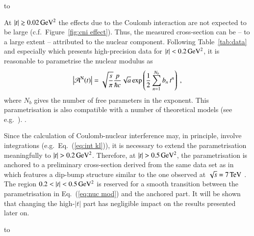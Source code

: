 \vskip3mm
\hbox to

At $|t| \gtrsim 0.02\,{\rm GeV^2}$ the effects due to the Coulomb interaction are not expected to be large (c.f.~Figure~\ref{fig:cni effect}). Thus, the measured cross-section can be -- to a large extent -- attributed to the nuclear component. Following Table~\ref{tab:data} and especially \cite{8tev-90m} which presents high-precision data for $|t| < 0.2\,{\rm GeV^2}$, it is reasonable to parametrise the nuclear modulus as
\begin{equation}
\label{eq:nuc mod}
\left | {\cal A}^{\rm N}(t) \right | = \sqrt{s\over\pi} {p\over \hbar c} \sqrt{a} \exp\left( {1\over 2} \sum\limits_{n = 1}^{N_b} b_n\, t^n \right)\ ,
\end{equation}
where $N_b$ gives the number of free parameters in the exponent. This parametrisation is also compatible with a number of theoretical models (see e.g.~\cite{elegent}). .

Since the calculation of Coulomb-nuclear interference may, in principle, involve integrations (e.g.~Eq.~(\ref{eq:int kl})), it is necessary to extend the parametrisation meaningfully to $|t| > 0.2\,{\rm GeV^2}$. Therefore, at $|t| > 0.5\,{\rm GeV^2}$, the parametrisation is anchored to a preliminary cross-section derived from the same data set as in \cite{8tev-90m} which features a dip-bump structure similar to the one observed at $\sqrt{s} = 7\,{\rm TeV}$ \cite{epl95}. The region $0.2 < |t| < 0.5\,{\rm GeV^2}$ is reserved for a smooth transition between the parametrisation in Eq.~(\ref{eq:nuc mod}) and the anchored part. It will be shown that changing the high-$|t|$ part has negligible impact on the results presented later on.


\vskip3mm
\hbox to


